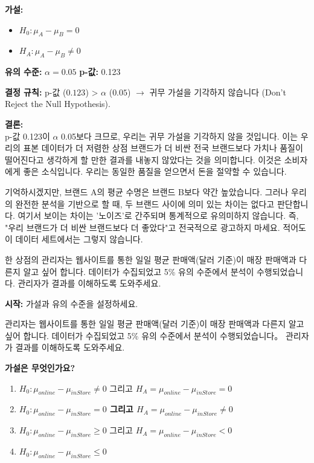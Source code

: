 \documentclass[11pt,a4paper]{book}
\theoremstyle{definition}
\begin{document}
\begin{infobox}[title=두 브랜드 비교 (8/8): 4단계 - 귀무 가설 기각 여부 결정]
\textbf{가설:}
\begin{itemize}
    \item $H_0 : \mu_A - \mu_B = 0$
    \item $H_A : \mu_A - \mu_B \neq 0$
\end{itemize}
\textbf{유의 수준:} $\alpha = 0.05$
\textbf{p-값:} 0.123

\textbf{결정 규칙:}
p-값 ($0.123$) > $\alpha$ ($0.05$) $\rightarrow$ 귀무 가설을 기각하지 않습니다 (Don't Reject the Null Hypothesis).

\textbf{결론:} \\
p-값 0.123이 $\alpha$ 0.05보다 크므로, 우리는 귀무 가설을 기각하지 않을 것입니다.
이는 우리의 표본 데이터가 더 저렴한 상점 브랜드가 더 비싼 전국 브랜드보다 가치나 품질이 떨어진다고 생각하게 할 만한 결과를 내놓지 않았다는 것을 의미합니다. 이것은 소비자에게 좋은 소식입니다. 우리는 동일한 품질을 얻으면서 돈을 절약할 수 있습니다.

기억하시겠지만, 브랜드 A의 평균 수명은 브랜드 B보다 약간 높았습니다. 그러나 우리의 완전한 분석을 기반으로 할 때, 두 브랜드 사이에 의미 있는 차이는 없다고 판단합니다. 여기서 보이는 차이는 '노이즈'로 간주되며 통계적으로 유의미하지 않습니다. 즉, "우리 브랜드가 더 비싼 브랜드보다 더 좋았다"고 전국적으로 광고하지 마세요. 적어도 이 데이터 세트에서는 그렇지 않습니다.
\end{infobox}

\begin{examplebox}[title=연습 문제: 온라인 vs. 매장 판매 - 문제 상황]
한 상점의 관리자는 웹사이트를 통한 일일 평균 판매액(달러 기준)이 매장 판매액과 다른지 알고 싶어 합니다. 데이터가 수집되었고 5\% 유의 수준에서 분석이 수행되었습니다. 관리자가 결과를 이해하도록 도와주세요.

\textbf{시작:} 가설과 유의 수준을 설정하세요.
\end{examplebox}

\begin{infobox}[title=연습 문제: 가설은 무엇인가요? (선택)]
관리자는 웹사이트를 통한 일일 평균 판매액(달러 기준)이 매장 판매액과 다른지 알고 싶어 합니다. 데이터가 수집되었고 5\% 유의 수준에서 분석이 수행되었습니다。 관리자가 결과를 이해하도록 도와주세요.

\textbf{가설은 무엇인가요?}
\begin{enumerate}
    \item $H_0 : \mu_{online} - \mu_{inStore} \neq 0$ 그리고 $H_A = \mu_{online} - \mu_{inStore} = 0$
    \item \textbf{$H_0 : \mu_{online} - \mu_{inStore} = 0$ 그리고 $H_A = \mu_{online} - \mu_{inStore} \neq 0$}
    \item $H_0 : \mu_{online} - \mu_{inStore} \ge 0$ 그리고 $H_A = \mu_{online} - \mu_{inStore} < 0$
    \item $H_0 : \mu_{online} - \mu_{inStore} \le 0$
\end{enumerate}
\end{infobox}
\end{document}
